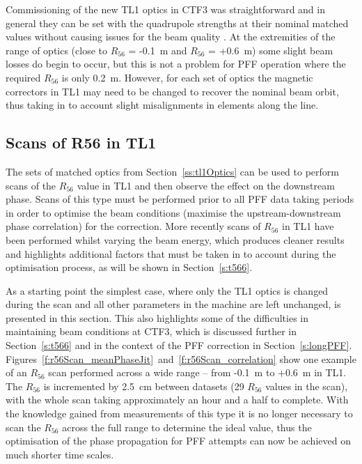 Commissioning of the new TL1 optics in CTF3 was straightforward and in general they can be set with the quadrupole strengths at their nominal matched values without causing issues for the beam quality \cite{piotrPriv}. At the extremities of the range of optics (close to \(R_{56}\) = -0.1~m and \(R_{56}\) = +0.6~m) some slight beam losses do begin to occur, but this is not a problem for PFF operation where the required \(R_{56}\) is only 0.2~m. However, for each set of optics the magnetic correctors in TL1 may need to be changed to recover the nominal beam orbit, thus taking in to account slight misalignments in elements along the line.

\subsection{Scans of R56 in TL1}
\label{ss:r56Scans}

The sets of matched optics from Section~\ref{ss:tl1Optics} can be used to perform scans of the \(R_{56}\) value in TL1 and then observe the effect on the downstream phase. Scans of this type must be performed prior to all PFF data taking periods in order to optimise the beam conditions (maximise the upstream-downstream phase correlation) for the correction. More recently scans of \(R_{56}\) in TL1 have been performed whilst varying the beam energy, which produces cleaner results and highlights additional factors that must be taken in to account during the optimisation process, as will be shown in Section~\ref{s:t566}. 

As a starting point the simplest case, where only the TL1 optics is changed during the scan and all other parameters in the machine are left unchanged, is presented in this section. This also highlights some of the difficulties in maintaining beam conditions at CTF3, which is discussed further in Section~\ref{s:t566} and in the context of the PFF correction in Section~\ref{s:longPFF}. Figures~\ref{f:r56Scan_meanPhaseJit}~and~\ref{f:r56Scan_correlation} show one example of an \(R_{56}\) scan performed across a wide range -- from -0.1~m to +0.6~m in TL1. The \(R_{56}\) is incremented by 2.5~cm between datasets (29 \(R_{56}\) values in the scan), with the whole scan taking approximately an hour and a half to complete. With the knowledge gained from measurements of this type it is no longer necessary to scan the \(R_{56}\) across the full range to determine the ideal value, thus the optimisation of the phase propagation for PFF attempts can now be achieved on much shorter time scales.

